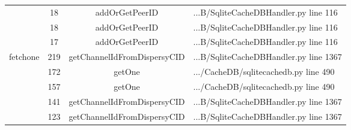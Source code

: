 \begin{table}[!h]
{\begin{tabular}{|c|c|c|l|}
		\multicolumn{1}{|c|}{} & \multicolumn{1}{c|}{18}  & \multicolumn{1}{c|}{addOrGetPeerID}  & \multicolumn{1}{l|}{...B/SqliteCacheDBHandler.py line 116}  \\ \cline{2-4} 
		\multicolumn{1}{|c|}{} & \multicolumn{1}{c|}{18}  & \multicolumn{1}{c|}{addOrGetPeerID}  & \multicolumn{1}{l|}{...B/SqliteCacheDBHandler.py line 116}  \\ \cline{2-4} 
		\multicolumn{1}{|c|}{} & \multicolumn{1}{c|}{17}  & \multicolumn{1}{c|}{addOrGetPeerID}  & \multicolumn{1}{l|}{...B/SqliteCacheDBHandler.py line 116}  \\ \hline 
		\multicolumn{1}{|c|}{\multirow{5}{*}{fetchone}} & \multicolumn{1}{c|}{219} & \multicolumn{1}{c|}{getChannelIdFromDispersyCID} & \multicolumn{1}{l|}{...B/SqliteCacheDBHandler.py line 1367} \\ \cline{2-4}
		\multicolumn{1}{|c|}{} & \multicolumn{1}{c|}{172}  & \multicolumn{1}{c|}{getOne}  & \multicolumn{1}{l|}{.../CacheDB/sqlitecachedb.py line 490}  \\ \cline{2-4} 
		\multicolumn{1}{|c|}{} & \multicolumn{1}{c|}{157}  & \multicolumn{1}{c|}{getOne}  & \multicolumn{1}{l|}{.../CacheDB/sqlitecachedb.py line 490}  \\ \cline{2-4} 
		\multicolumn{1}{|c|}{} & \multicolumn{1}{c|}{141}  & \multicolumn{1}{c|}{getChannelIdFromDispersyCID}  & \multicolumn{1}{l|}{...B/SqliteCacheDBHandler.py line 1367}  \\ \cline{2-4} 
		\multicolumn{1}{|c|}{} & \multicolumn{1}{c|}{123}  & \multicolumn{1}{c|}{getChannelIdFromDispersyCID}  & \multicolumn{1}{l|}{...B/SqliteCacheDBHandler.py line 1367}  \\ \hline 
		
	\end{tabular}}
\end{table}
		
